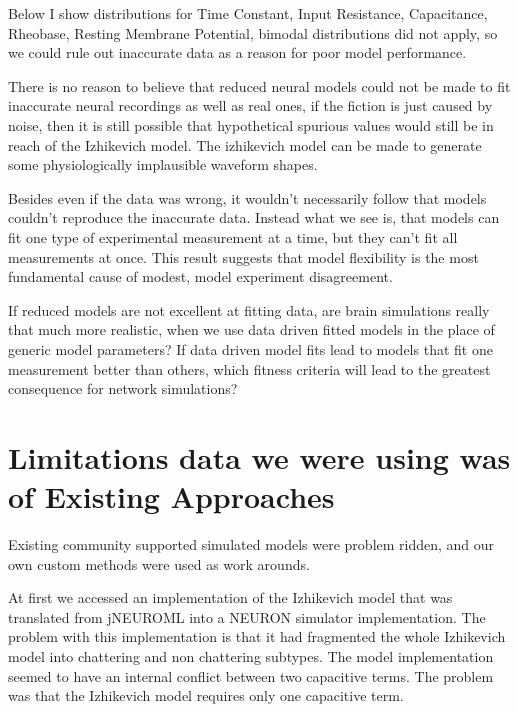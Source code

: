 Below I show distributions for  Time Constant, Input Resistance, Capacitance, Rheobase, Resting Membrane Potential, bimodal distributions did not apply, so we could rule out inaccurate data as a reason for poor model performance.

There is no reason to believe that reduced neural models could not be made to fit inaccurate neural recordings as well as real ones, if the fiction is just caused by noise, then it is still possible that hypothetical spurious values would still be in reach of the Izhikevich model. The izhikevich model can be made to generate some physiologically implausible waveform shapes. 

Besides even if the data was wrong, it wouldn't necessarily follow that models couldn't reproduce the inaccurate data. Instead what we see is, that models can fit one type of experimental measurement at a time, but they can't fit all measurements at once. This result suggests that model flexibility is the most fundamental cause of modest, model experiment disagreement.


If reduced models are not excellent at fitting data, are brain simulations really that much more realistic, when we use data driven fitted models in the place of generic model parameters? If data driven model fits lead to models that fit one measurement better than others, which fitness criteria will lead to the greatest consequence for network simulations?





\section{Limitations data we were using was of Existing Approaches} 
Existing community supported simulated models were problem ridden, and our own custom methods were used as work arounds.


At first we accessed an implementation of the Izhikevich model that was translated from jNEUROML into a NEURON simulator implementation. The problem with this implementation is that it had fragmented the whole Izhikevich model into chattering and non chattering subtypes. The model implementation seemed to have an internal conflict between two capacitive terms. The problem was that the Izhikevich model requires only one capacitive term.

